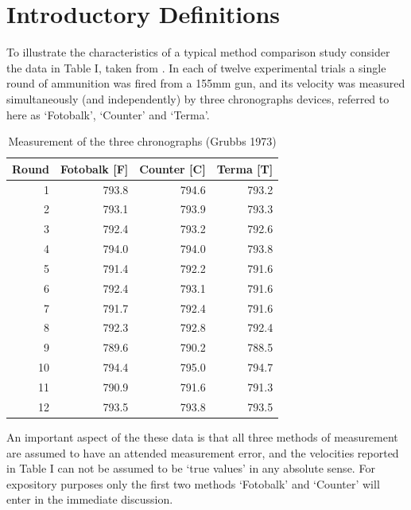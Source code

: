 \documentclass[12pt, a4paper]{report}
\theoremstyle{plain}
\theoremstyle{definition}
\theoremstyle{remark}
\begin{document}
	
	
	
	\section{Introductory Definitions}
	
	
	


	To illustrate the characteristics of a typical method comparison study consider the data in Table I, taken from \citet{Grubbs73}.
	\smallskip
	In each of twelve experimental trials a single round of ammunition was fired from a 155mm gun, and its velocity was measured
	simultaneously (and independently) by three chronographs devices, referred to here as `Fotobalk', `Counter' and `Terma'.
	\smallskip
	
	
	\newpage
	
	\begin{table}[ht]
		\begin{center}
			\begin{tabular}{rrrr}
				\hline
				Round& Fotobalk [F] & Counter [C]& Terma [T]\\
				\hline
				1 & 793.8 & 794.6 & 793.2 \\
				2 & 793.1 & 793.9 & 793.3 \\
				3 & 792.4 & 793.2 & 792.6 \\
				4 & 794.0 & 794.0 & 793.8 \\
				5 & 791.4 & 792.2 & 791.6 \\
				6 & 792.4 & 793.1 & 791.6 \\
				7 & 791.7 & 792.4 & 791.6 \\
				8 & 792.3 & 792.8 & 792.4 \\
				9 & 789.6 & 790.2 & 788.5 \\
				10 & 794.4 & 795.0 & 794.7 \\
				11 & 790.9 & 791.6 & 791.3 \\
				12 & 793.5 & 793.8 & 793.5 \\
				\hline
			\end{tabular}
			\caption{Measurement of the three chronographs (Grubbs 1973)}
		\end{center}
	\end{table}
	
	An important aspect of the these data is that all three methods of
	measurement are assumed to have an attended measurement error, and
	the velocities reported in Table I can not be assumed to be `true
	values' in any absolute sense. For expository purposes only the
	first two methods `Fotobalk' and `Counter' will enter in the
	immediate discussion.
	
\end{document}
